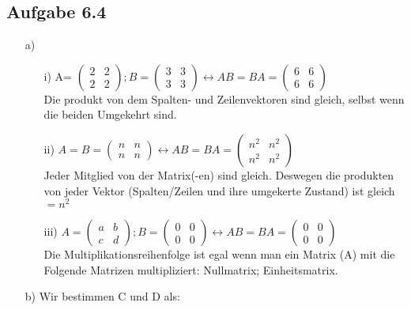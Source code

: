 \documentclass{standalone}
\begin{document}
\subsection{Aufgabe 6.4}
\begin{itemize}
	\item[a)]
	\begin{itemize}
		\item[i)]
		A= $\begin{pmatrix}
			2 & 2 \\
			2 & 2
		\end{pmatrix};
		B=\begin{pmatrix}
			3 & 3 \\
			3 & 3
		\end{pmatrix} \leftrightarrow
		AB=BA=\begin{pmatrix}
			6 & 6 \\
			6 & 6
		\end{pmatrix}$\\
Die produkt von dem Spalten- und Zeilenvektoren sind gleich, selbst wenn die beiden Umgekehrt sind. 
		\item[ii)]
	$A=
	B=\begin{pmatrix}
		n & n \\
		n & n
	\end{pmatrix} \leftrightarrow
	AB=BA=\begin{pmatrix}
		n^2 & n^2 \\
		n^2 & n^2
	\end{pmatrix}$\\
Jeder Mitglied von der Matrix(-en) sind gleich. Deswegen die produkten von jeder Vektor (Spalten/Zeilen und ihre umgekerte Zustand) ist gleich $=n^2$ 
\item[iii)]
$A=\begin{pmatrix}
	a & b \\
	c & d
\end{pmatrix}; 
B=\begin{pmatrix}
	0 & 0 \\
	0 & 0
\end{pmatrix} \leftrightarrow
AB=BA=\begin{pmatrix}
	0 & 0 \\
	0 & 0
\end{pmatrix}$\\
Die Multiplikationsreihenfolge ist egal wenn man ein Matrix (A) mit die Folgende Matrizen multipliziert: Nullmatrix; Einheitsmatrix.
	\end{itemize}
	\item[b)] Wir bestimmen C und D als:\\
	

\end{itemize}
\end{document}
